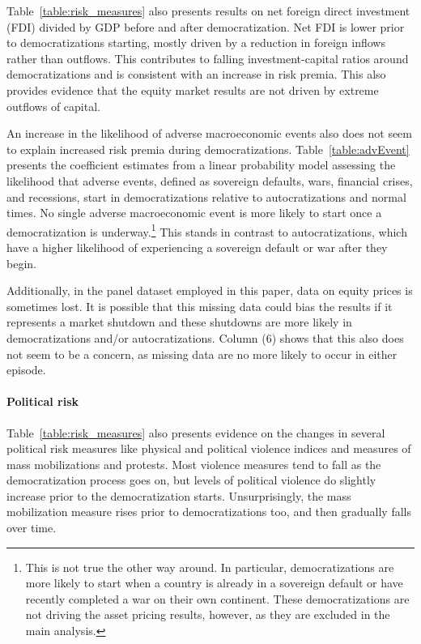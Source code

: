  

Table~\ref{table:risk_measures} also presents results on net foreign direct investment (FDI) divided by GDP before and after democratization. Net FDI is lower prior to democratizations starting, mostly driven by a reduction in foreign inflows rather than outflows. This contributes to falling investment-capital ratios around democratizations and is consistent with an increase in risk premia.  This also provides evidence that the equity market results are not driven by extreme outflows of capital.

An increase in the likelihood of adverse macroeconomic events also does not seem to explain increased risk premia during democratizations. Table~\ref{table:advEvent} presents the coefficient estimates from a linear probability model assessing the likelihood that adverse events, defined as sovereign defaults, wars, financial crises, and recessions, start in democratizations relative to autocratizations and normal times.  No single adverse macroeconomic event is more likely to start once a democratization is underway.\footnote{This is not true the other way around. In particular, democratizations are more likely to start when a country is already in a sovereign default or have recently completed a war on their own continent. These democratizations are not driving the asset pricing results, however, as they are excluded in the main analysis.} This stands in contrast to autocratizations, which have a higher likelihood of experiencing a sovereign default or war after they begin.



Additionally, in the panel dataset employed in this paper, data on equity prices is sometimes lost. It is possible that this missing data could bias the results if it represents a market shutdown and these shutdowns are more likely in democratizations and/or autocratizations. Column (6) shows that this also does not seem to be a concern, as missing data are no more likely to occur in either episode. 


\paragraph{Political risk}

Table~\ref{table:risk_measures} also presents evidence on the changes in several political risk measures like physical and political violence indices and measures of mass mobilizations and protests. Most violence measures tend to fall as the democratization process goes on, but levels of political violence do slightly increase prior to the democratization starts. Unsurprisingly, the mass mobilization measure rises prior to democratizations too, and then gradually falls over time. 

